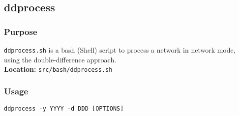 \subsection{ddprocess}
\label{ddprocess}

\subsubsection{Purpose}
\texttt{ddprocess.sh} is a bash (Shell) script to process a network in network mode, using the double-difference approach.\\
\textbf{Location:} \texttt{src/bash/ddprocess.sh}

\subsubsection{Usage}
\texttt{ddprocess -y YYYY -d DDD [OPTIONS]}\\

